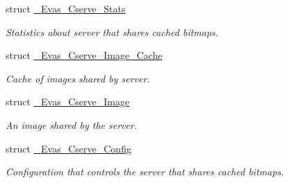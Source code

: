 \begin{DoxyCompactItemize}
struct \hyperlink{struct__Evas__Cserve__Stats}{\_\-Evas\_\-Cserve\_\-Stats}
\begin{DoxyCompactList}\small\item\em Statistics about server that shares cached bitmaps. \item\end{DoxyCompactList}\item 
struct \hyperlink{struct__Evas__Cserve__Image__Cache}{\_\-Evas\_\-Cserve\_\-Image\_\-Cache}
\begin{DoxyCompactList}\small\item\em Cache of images shared by server. \item\end{DoxyCompactList}\item 
struct \hyperlink{struct__Evas__Cserve__Image}{\_\-Evas\_\-Cserve\_\-Image}
\begin{DoxyCompactList}\small\item\em An image shared by the server. \item\end{DoxyCompactList}\item 
struct \hyperlink{struct__Evas__Cserve__Config}{\_\-Evas\_\-Cserve\_\-Config}
\begin{DoxyCompactList}\small\item\em Configuration that controls the server that shares cached bitmaps. \item\end{DoxyCompactList}\end{DoxyCompactItemize}
